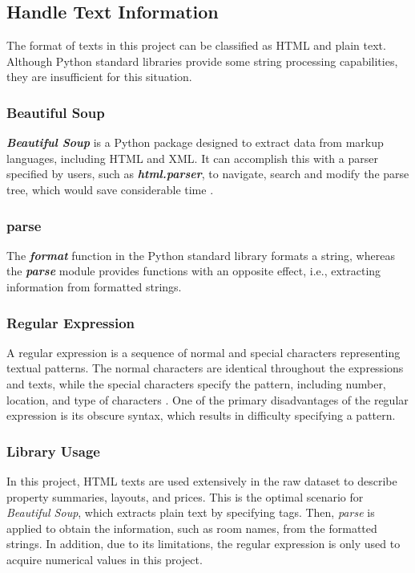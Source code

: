 \documentclass[12pt,twoside]{report}
\begin{document}
\subsection{Handle Text Information}
The format of texts in this project can be classified as HTML and plain text. Although Python standard libraries provide some string processing capabilities, they are insufficient for this situation. 

\subsubsection{Beautiful Soup}
\textit{\textbf{Beautiful Soup}} is a Python package designed to extract data from markup languages, including HTML and XML. It can accomplish this with a parser specified by users, such as \textbf{\textit{html.parser}}, to navigate, search and modify the parse tree, which would save considerable time \citep{RN10}. 

\subsubsection{parse}
The \textit{\textbf{format}} function in the Python standard library formats a string, whereas the \textit{\textbf{parse}} module provides functions with an opposite effect, i.e., extracting information from formatted strings.

\subsubsection{Regular Expression}
A regular expression is a sequence of normal and special characters representing textual patterns. The normal characters are identical throughout the expressions and texts, while the special characters specify the pattern, including number, location, and type of characters  \citep{RN14}. One of the primary disadvantages of the regular expression is its obscure syntax, which results in difficulty specifying a pattern. 

\subsubsection{Library Usage}
In this project, HTML texts are used extensively in the raw dataset to describe property summaries, layouts, and prices. This is the optimal scenario for \textit{Beautiful Soup}, which extracts plain text by specifying tags. Then, \textit{parse} is applied to obtain the information, such as room names, from the formatted strings. In addition, due to its limitations, the regular expression is only used to acquire numerical values in this project. 
\end{document}
